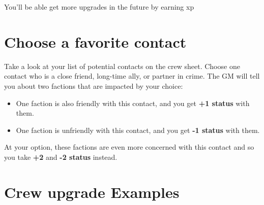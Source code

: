 \documentclass[11pt,fleqn,a5paper]{book}
\begin{document}
You’ll be able get more upgrades in the future by earning xp

\section{Choose a favorite contact}

Take a look at your list of potential contacts on the crew sheet. Choose one contact who is a close friend, long-time ally, or partner in crime. The GM will tell you about two factions that are impacted by your choice:

\begin{itemize}
	\item One faction is also friendly with this contact, and you get \textbf{+1 status} with them.
	\item One faction is unfriendly with this contact, and you get \textbf{-1 status} with them.
\end{itemize}

At your option, these factions are even more concerned with this contact and so you take \textbf{+2} and \textbf{-2 status} instead.

\section{Crew upgrade Examples}
\end{document}
